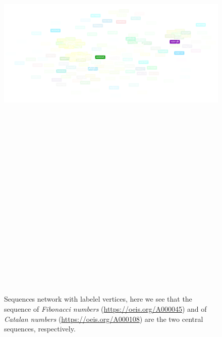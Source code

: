 \newpage
\begin{figure}
\begin{sideways}
\includegraphics[width=25cm, height=25cm]{OEIS/coloured}
\caption{Sequences network with labelel vertices, here we see that the sequence
of \textit{Fibonacci numbers} (\url{https://oeis.org/A000045}) and of
\textit{Catalan numbers} (\url{https://oeis.org/A000108}) are the two central
sequences, respectively.}
\end{sideways}
\label{fig:oeis:sequences:network:fibonacci:catalan:labeled}
\end{figure}


